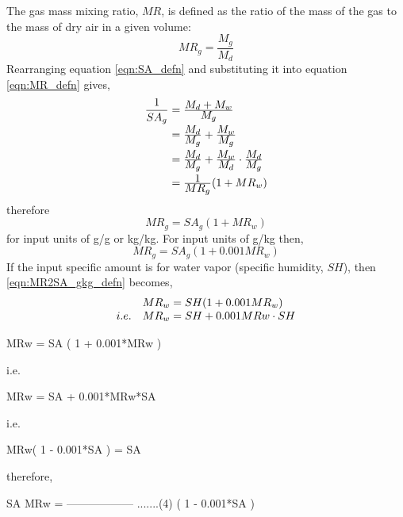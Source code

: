 The gas mass mixing ratio, $MR$, is defined as the ratio of the mass of the gas to the mass of dry air in a given volume:
\begin{equation}
  MR_g = \frac{M_g}{M_d}
  \label{eqn:MR_defn}
\end{equation}
Rearranging equation \ref{eqn:SA_defn} and substituting it into equation \ref{eqn:MR_defn} gives,
\begin{equation*}
  \begin{array}{c@{{}={}}l}
    \displaystyle
    \frac{\D 1}{\D SA_g} & \frac{\D M_d + M_w}{\D M_g}\\[0.1in]
                         & \frac{\D M_d}{\D M_g} + \frac{\D M_w}{\D M_g}\\[0.1in]
                         & \frac{\D M_d}{\D M_g} + \frac{\D M_w}{\D M_d}\cdot\frac{\D M_d}{\D M_g}\\[0.1in]
                         & \frac{\D 1}{\D MR_g}(1 + MR_w)
  \end{array}
\end{equation*}
therefore
\begin{equation}
  MR_g = SA_g(1 + MR_w)
  \label{eqn:MR2SA_defn}
\end{equation}
for input units of g/g or kg/kg. For input units of g/kg then,
\begin{equation}
  MR_g = SA_g(1 + 0.001MR_w)
  \label{eqn:MR2SA_gkg_defn}
\end{equation}
If the input specific amount is for water vapor (specific humidity, $SH$), then \ref{eqn:MR2SA_gkg_defn} becomes,
\begin{equation}
  \begin{array}{ll@{{}={}}l}
       & MR_w & SH(1 + 0.001MR_w)\\
  i.e. & MR_w & SH + 0.001MRw\cdot SH
  \end{array}
  \label{eqn:MR2SH_defn}
\end{equation}

         MRw = SA ( 1 + 0.001*MRw )

       i.e.

         MRw = SA + 0.001*MRw*SA

       i.e.

         MRw( 1 - 0.001*SA ) = SA

       therefore,

                      SA
         MRw = ------------------   .......(4)
                ( 1 - 0.001*SA )







